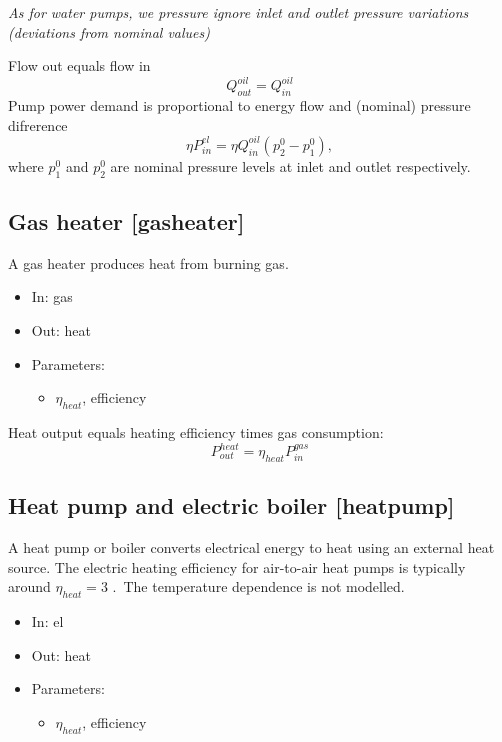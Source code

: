 \documentclass[12pt]{article}
\begin{document}
\textit{As for water pumps, we pressure ignore inlet and outlet pressure variations (deviations from nominal values)}

Flow out equals flow in
\begin{equation}
	Q_{out}^{oil}=Q_{in}^{oil}
\end{equation}
Pump power demand is proportional to energy flow and (nominal) pressure difrerence
\begin{equation}
	\eta P^{el}_{in} = \eta Q_{in}^{oil}(p^0_2-p^0_1),
\end{equation}
where $p^0_1$ and $p^0_2$ are nominal pressure levels at inlet and outlet respectively.


\subsection{Gas heater [gasheater]}
A gas heater produces heat from burning gas.

\begin{itemize}
\item In: gas
\item Out: heat
\item Parameters:
\begin{itemize}[noitemsep,topsep=0pt]
	\item $\eta_{heat}$,  efficiency
\end{itemize}
\end{itemize}

Heat output equals heating efficiency times gas consumption:
\begin{equation}
	P_{out}^{heat}= \eta _{heat}P_{in}^{gas}
\end{equation}



\subsection{Heat pump and electric boiler [heatpump]}

A heat pump or boiler converts electrical energy to heat using an external heat source. The electric heating efficiency for air-to-air heat pumps is typically around  \(  \eta _{heat}=3 \) .\  The temperature dependence is not modelled.

\begin{itemize}
\item In: el
\item Out: heat
\item Parameters:
\begin{itemize}[noitemsep,topsep=0pt]
	\item $\eta_{heat}$,  efficiency
\end{itemize}
\end{itemize}
\end{document}
